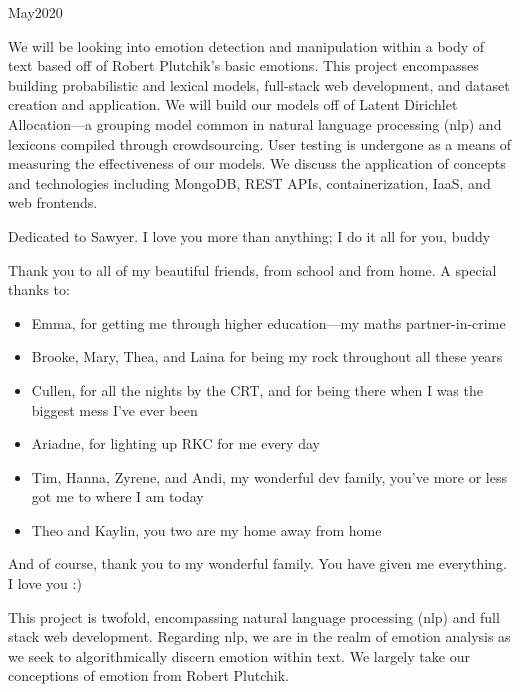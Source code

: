 \documentclass[11pt, twoside, reqno]{book}
\begin{document}
    {May}{2020}

\abstr
We will be looking into emotion detection and manipulation within a body of text based off of Robert Plutchik's basic emotions. This project encompasses building probabilistic and lexical models, full-stack web development, and dataset creation and application. We will build our models off of Latent Dirichlet Allocation—a grouping model common in natural language processing (nlp) and lexicons compiled through crowdsourcing. User testing is undergone as a means of measuring the effectiveness of our models. We discuss the application of concepts and technologies including MongoDB, REST APIs, containerization, IaaS, and web frontends.

\tableofcontents

\dedic

Dedicated to Sawyer. I love you more than anything; I do it all for you, buddy

\acknowl

Thank you to all of my beautiful friends, from school and from home. A special thanks to:

\begin{itemize}
  \item Emma, for getting me through higher education—my maths partner-in-crime
  \item Brooke, Mary, Thea, and Laina for being my rock throughout all these years
  \item  Cullen, for all the nights by the CRT, and for being there when I was the biggest mess I've ever been
  \item  Ariadne, for lighting up RKC for me every day
  \item Tim, Hanna, Zyrene, and Andi, my wonderful dev family, you've more or less got me to where I am today
  \item Theo and Kaylin, you two are my home away from home
\end{itemize}

And of course, thank you to my wonderful family. You have given me everything. I love you :)

\startmain

\intro

This project is twofold, encompassing natural language processing (nlp) and full stack web development. Regarding nlp, we are in the realm of emotion analysis as we seek to algorithmically discern emotion within text. We largely take our conceptions of emotion from Robert Plutchik.
\end{document}
